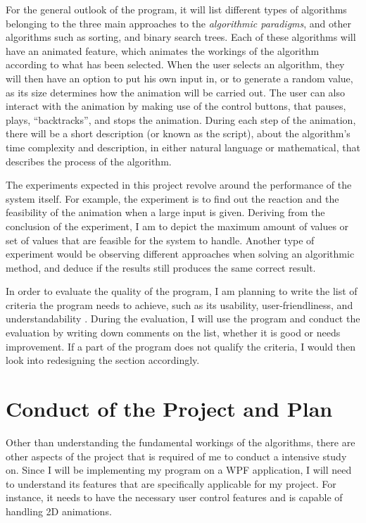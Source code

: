 \documentclass[12pt,a4paper,oneside]{report}
\begin{document}
For the general outlook of the program, it will list different types of algorithms belonging to the three main approaches to the \textit{algorithmic paradigms}, and other algorithms such as sorting, and binary search trees. Each of these algorithms will have an animated feature, which animates the workings of the algorithm according to what has been selected. When the user selects an algorithm, they will then have an option to put his own input in, or to generate a random value, as its size determines how the animation will be carried out. The user can also interact with the animation by making use of the control buttons, that pauses, plays, ``backtracks'', and stops the animation. During each step of the animation, there will be a short description (or known as the script), about the algorithm's time complexity and description, in either natural language or mathematical, that describes the process of the algorithm.

The experiments expected in this project revolve around the performance of the system itself. For example, the experiment is to find out the reaction and the feasibility of the animation when a large input is given. Deriving from the conclusion of the experiment, I am to depict the maximum amount of values or set of values that are feasible for the system to handle. 
Another type of experiment would be observing different approaches when solving an algorithmic method, and deduce if the results still produces the same correct result.

In order to evaluate the quality of the program, I am planning to write the list of criteria the program needs to achieve, such as its usability, user-friendliness, and understandability \nocite{jackson_software_2014}. During the evaluation, I will use the program and conduct the evaluation by writing down comments on the list, whether it is good or needs improvement. If a part of the program does not qualify the criteria, I would then look into redesigning the section accordingly.

\section*{Conduct of the Project and Plan}

Other than understanding the fundamental workings of the algorithms, there are other aspects of the project that is required of me to conduct a intensive study on. Since I will be implementing my program on a WPF application, I will need to understand its features that are specifically applicable for my project. For instance, it needs to have the necessary user control features and is capable of handling 2D animations. 
\end{document}
